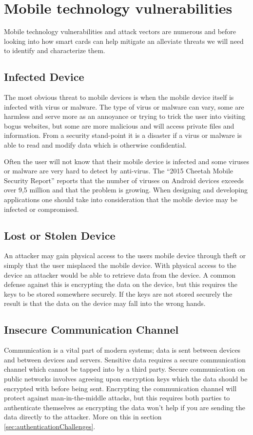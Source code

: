 \section{Mobile technology vulnerabilities}
Mobile technology vulnerabilities and attack vectors are numerous and before looking into how smart cards can help mitigate an alleviate threats we will need to identify and characterize them.
\subsection{Infected Device}
The most obvious threat to mobile devices is when the mobile device itself is infected with virus or malware. The type of virus or malware can vary, some are harmless and serve more as an annoyance or trying to trick the user into visiting bogus websites, but some are more malicious and will access private files and information. From a security stand-point it is a disaster if a virus or malware is able to read and modify data which is otherwise confidential.

Often the user will not know that their mobile device is infected and some viruses or malware are very hard to detect by anti-virus. The ``2015 Cheetah Mobile Security Report'' \cite{cheetahSec} reports that the number of viruses on Android devices exceeds over 9,5 million and that the problem is growing. When designing and developing applications one should take into consideration that the mobile device may be infected or compromised.


\subsection{Lost or Stolen Device}
An attacker may gain physical access to the users mobile device through theft or simply that the user misplaced the mobile device. With physical access to the device an attacker would be able to retrieve data from the device. A common defense against this is encrypting the data on the device, but this requires the keys to be stored somewhere securely. If the keys are not stored securely the result is that the data on the device may fall into the wrong hands.

\subsection{Insecure Communication Channel}
\label{sec:unsecureCommunication}
Communication is a vital part of modern systems; data is sent between devices and between devices and servers. Sensitive data requires a secure communication channel which cannot be tapped into by a third party. Secure communication on public networks involves agreeing upon encryption keys which the data should be encrypted with before being sent. Encrypting the communication channel will protect against man-in-the-middle attacks, but this requires both parties to authenticate themselves as encrypting the data won't help if you are sending the data directly to the attacker. More on this in section \ref{sec:authenticationChallenges}.

